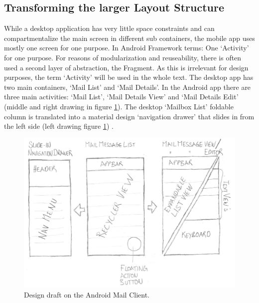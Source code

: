 \documentclass[a4paper,11pt,twoside]{article}
\begin{document}
\subsection{Transforming the larger Layout Structure}
While a desktop application has very little space constraints and can
compartmentalize the main screen in different sub containers, the mobile app
uses mostly one screen for one purpose. In Android Framework terms: One `Activity'
for one purpose. For reasons of modularization and
reuseability, there is often used a second layer of abstraction, the
Fragment. As this is irrelevant for design purposes, the term `Activity' will be
used in
the whole text. The desktop app has two main containers, `Mail List' and `Mail
Details'.  In the Android app there are three main activities: `Mail List',
`Mail Details View' and `Mail Details Edit' (middle and right drawing in figure
\ref{fig:hand_design}). The desktop `Mailbox List' foldable column is translated
into a material design `navigation drawer' that slides in from the left side
(left drawing figure \ref{fig:hand_design}) \cite{navigation_drawer}.


\begin{figure}
    \includegraphics[width=1\textwidth]{hand_design.png}
    \caption{Design draft on the Android Mail Client.}
    \label{fig:hand_design}
\end{figure}
\end{document}
